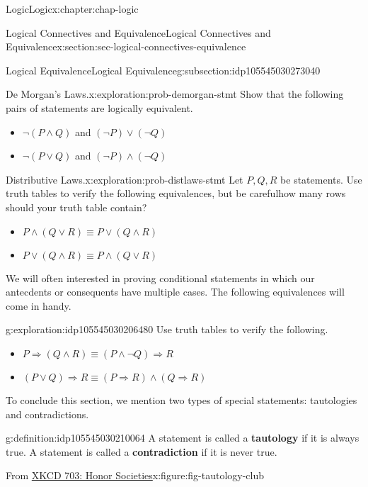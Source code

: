 \documentclass[oneside,10pt,]{book}
\newcommand{\terminology}[1]{\textbf{#1}}
\begin{document}
\begin{chapterptx}{Logic}{}{Logic}{}{}{x:chapter:chap-logic}
\begin{sectionptx}{Logical Connectives and Equivalence}{}{Logical Connectives and Equivalence}{}{}{x:section:sec-logical-connectives-equivalence}
\begin{subsectionptx}{Logical Equivalence}{}{Logical Equivalence}{}{}{g:subsection:idp105545030273040}
\begin{exploration}{De Morgan's Laws.}{x:exploration:prob-demorgan-stmt}%
Show that the following pairs of statements are logically equivalent.%
%
\begin{itemize}[label=\textbullet]
\item{}\(\neg (P\land Q)\) and \((\neg P) \lor (\neg Q)\)%
\item{}\(\neg (P\lor Q)\) and \((\neg P)\land (\neg Q)\)%
\end{itemize}
\end{exploration}%
\begin{exploration}{Distributive Laws.}{x:exploration:prob-distlaws-stmt}%
Let \(P, Q, R\) be statements. Use truth tables to verify the following equivalences, but be careful\textemdash{}how many rows should your truth table contain?%
%
\begin{itemize}[label=\textbullet]
\item{}\(\displaystyle P\land (Q\lor R) \equiv P\lor (Q\land R)\)%
\item{}\(\displaystyle P\lor (Q\land R) \equiv P \land (Q\lor R)\)%
\end{itemize}
\end{exploration}%
We will often interested in proving conditional statements in which our antecdents or consequents have multiple cases. The following equivalences will come in handy.%
\begin{exploration}{}{g:exploration:idp105545030206480}%
Use truth tables to verify the following.%
%
\begin{itemize}[label=\textbullet]
\item{}\(\displaystyle P\Rightarrow (Q\land R) \equiv (P\land \neg Q)\Rightarrow R\)%
\item{}\(\displaystyle (P\lor Q)\Rightarrow R \equiv (P\Rightarrow R)\land (Q\Rightarrow R)\)%
\end{itemize}
\end{exploration}%
To conclude this section, we mention two types of special statements: tautologies and contradictions.%
\begin{definition}{}{g:definition:idp105545030210064}%
%
%
A statement is called a \terminology{tautology} if it is always true. A statement is called a \terminology{contradiction} if it is never true.%
\end{definition}
\begin{figureptx}{From \href{https://xkcd.com/703/}{XKCD 703: Honor Societies}\protect\footnotemark{}}{x:figure:fig-tautology-club}{}%

\end{figureptx}
\end{subsectionptx}
\end{sectionptx}
\end{chapterptx}
\end{document}

